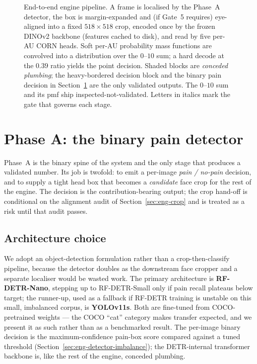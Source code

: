 \begin{figure}[t]
\caption[End-to-end engine pipeline]{End-to-end engine pipeline. A frame is
localised by the Phase~A detector, the box is margin-expanded and (if Gate~5
requires) eye-aligned into a fixed $518\times518$ crop, encoded once by the
frozen DINOv2 backbone (features cached to disk), and read by five per-AU CORN
heads. Soft per-AU probability mass functions are convolved into a distribution
over the $0$--$10$ sum; a hard decode at the $0.39$ ratio yields the point
decision. Shaded blocks are \emph{conceded plumbing}; the heavy-bordered
decision block and the binary pain decision in Section~\ref{sec:eng-detector}
are the only validated outputs. The $0$--$10$ sum and its pmf ship
inspected-not-validated. Letters in italics mark the gate that governs each
stage.}
\label{fig:eng-pipeline}
\end{figure}

\section{Phase A: the binary pain detector}
\label{sec:eng-detector}

Phase~A is the binary spine of the system and the only stage that produces a
validated number. Its job is twofold: to emit a per-image \emph{pain /
no-pain} decision, and to supply a tight head box that becomes a
\emph{candidate} face crop for the rest of the engine. The decision is the
contribution-bearing output; the crop hand-off is conditional on the alignment
audit of Section~\ref{sec:eng-crop} and is treated as a risk until that audit
passes.

\subsection{Architecture choice}
\label{sec:eng-detector-arch}

We adopt an object-detection formulation rather than a crop-then-classify
pipeline, because the detector doubles as the downstream face cropper and a
separate localiser would be wasted work. The primary architecture is
\textbf{RF-DETR-Nano}, stepping up to RF-DETR-Small only if pain recall
plateaus below target; the runner-up, used as a fallback if RF-DETR training is
unstable on this small, imbalanced corpus, is \textbf{YOLOv11s}. Both are
fine-tuned from COCO-pretrained weights --- the COCO ``cat'' category makes
transfer expected, and we present it as such rather than as a benchmarked
result. The per-image binary decision is the maximum-confidence pain-box score
compared against a tuned threshold (Section~\ref{sec:eng-detector-imbalance});
the DETR-internal transformer backbone is, like the rest of the engine,
conceded plumbing.

